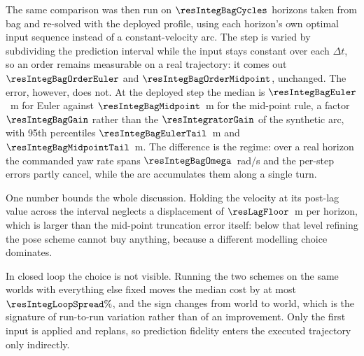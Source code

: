 \begin{table}[htbp]
  \centering
  \small
  \caption{Fitted global truncation order of the two integrators, by motion regime (log--log fit of the global error against the step size, on a constant-velocity arc whose exact solution is known).}
  \label{res:tab:order}
\end{table}


The same comparison was then run on $\resIntegBagCycles$ horizons taken from bag \texttt{\resIntegBagName} and re-solved with the deployed profile, using each horizon's own optimal input sequence instead of a constant-velocity arc. The step is varied by subdividing the prediction interval while the input stays constant over each $\Delta t$, so an order remains measurable on a real trajectory: it comes out $\resIntegBagOrderEuler$ and $\resIntegBagOrderMidpoint$, unchanged. The error, however, does not. At the deployed step the median is $\resIntegBagEuler$~m for Euler against $\resIntegBagMidpoint$~m for the mid-point rule, a factor $\resIntegBagGain$ rather than the $\resIntegratorGain$ of the synthetic arc, with 95th percentiles $\resIntegBagEulerTail$~m and $\resIntegBagMidpointTail$~m. The difference is the regime: over a real horizon the commanded yaw rate spans $\resIntegBagOmega$~rad/s and the per-step errors partly cancel, while the arc accumulates them along a single turn.

One number bounds the whole discussion. Holding the velocity at its post-lag value across the interval neglects a displacement of $\resLagFloor$~m per horizon, which is larger than the mid-point truncation error itself: below that level refining the pose scheme cannot buy anything, because a different modelling choice dominates.

\begin{table}[htbp]
  \centering
  \small
  \caption{Median position error at the end of the horizon, over 12 horizons re-solved from bag \texttt{\resIntegBagName}, against the exact arc on the same velocity sequence. The first row is the deployed step; the others subdivide the prediction interval without changing the input.}
  \label{res:tab:integbag}
\end{table}


In closed loop the choice is not visible. Running the two schemes on the same worlds with everything else fixed moves the median cost by at most $\resIntegLoopSpread\%$, and the sign changes from world to world, which is the signature of run-to-run variation rather than of an improvement. Only the first input is applied and \astar{} replans, so prediction fidelity enters the executed trajectory only indirectly.

